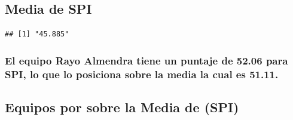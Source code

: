 \documentclass[]{article}
\newenvironment{Shaded}{\begin{snugshade}}{\end{snugshade}}
\newcommand{\CommentTok}[1]{\textcolor[rgb]{0.56,0.35,0.01}{\textit{#1}}}
\newcommand{\DataTypeTok}[1]{\textcolor[rgb]{0.13,0.29,0.53}{#1}}
\newcommand{\KeywordTok}[1]{\textcolor[rgb]{0.13,0.29,0.53}{\textbf{#1}}}
\newcommand{\NormalTok}[1]{#1}
\newcommand{\OperatorTok}[1]{\textcolor[rgb]{0.81,0.36,0.00}{\textbf{#1}}}
\newcommand{\OtherTok}[1]{\textcolor[rgb]{0.56,0.35,0.01}{#1}}
\newcommand{\StringTok}[1]{\textcolor[rgb]{0.31,0.60,0.02}{#1}}
\begin{document}
\hypertarget{media-de-spi}{%
\subsection{Media de SPI}\label{media-de-spi}}

\begin{Shaded}
\end{Shaded}

\begin{verbatim}
## [1] "45.885"
\end{verbatim}

\hypertarget{el-equipo-rayo-almendra-tiene-un-puntaje-de-52.06-para-spi-lo-que-lo-posiciona-sobre-la-media-la-cual-es-51.11.}{%
\subsubsection{El equipo Rayo Almendra tiene un puntaje de 52.06 para
SPI, lo que lo posiciona sobre la media la cual es
51.11.}\label{el-equipo-rayo-almendra-tiene-un-puntaje-de-52.06-para-spi-lo-que-lo-posiciona-sobre-la-media-la-cual-es-51.11.}}

\hypertarget{equipos-por-sobre-la-media-de-spi}{%
\subsection{Equipos por sobre la Media de
(SPI)}\label{equipos-por-sobre-la-media-de-spi}}

\begin{Shaded}
\end{Shaded}
\end{document}
